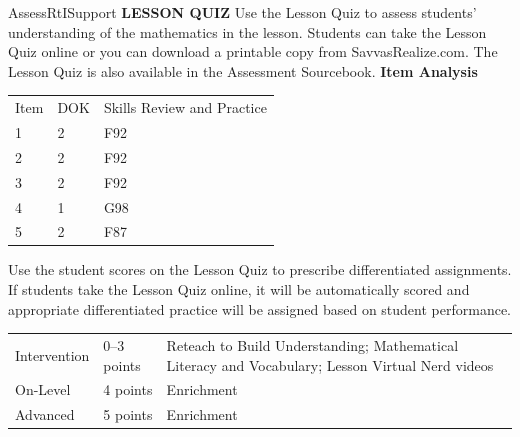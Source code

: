 \documentclass{article}
\newenvironment{te-addendum}[2]{}{}     %
\newcommand{\te}[1]{}                   %
\begin{document}
\begin{te-addendum}{Assess}{RtISupport}
\textbf{LESSON QUIZ}
Use the Lesson Quiz to assess students' understanding of the mathematics in the lesson.
Students can take the Lesson Quiz online or you can download a printable copy from SavvasRealize.com. The Lesson Quiz is also available in the Assessment Sourcebook.
\textbf{Item Analysis}
\begin{tabular}{lll}
Item & DOK & Skills Review and Practice \\
1 & 2 & F92 \\
2 & 2 & F92 \\
3 & 2 & F92 \\
4 & 1 & G98 \\
5 & 2 & F87 \\
\end{tabular}
Use the student scores on the Lesson Quiz to prescribe differentiated assignments.
If students take the Lesson Quiz online, it will be automatically scored and appropriate differentiated practice will be assigned based on student performance.
\begin{tabular}{lll}
Intervention & 0--3 points & Reteach to Build Understanding; Mathematical Literacy and Vocabulary; Lesson Virtual Nerd videos \\
On-Level & 4 points & Enrichment \\
Advanced & 5 points & Enrichment \\
\end{tabular}
\te{Assessment. Lesson Quiz is available at SavvasRealize.com.}
\end{te-addendum}
\end{document}
